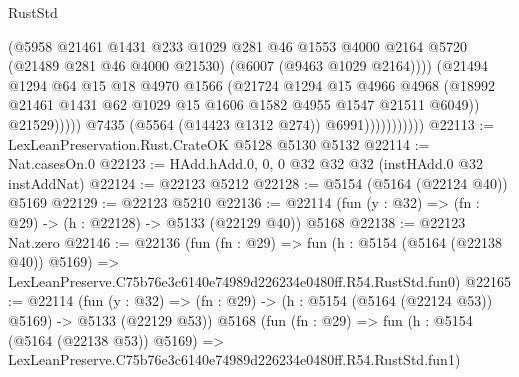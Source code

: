 \begin{lexlean}{RustStd}
\begin{coremodule}
                                    (@5958
                                      @21461
                                      @1431
                                      @233
                                      @1029
                                      @281
                                      @46
                                      @1553
                                      @4000
                                      @2164
                                      @5720
                                      (@21489 @281 @46 @4000 @21530)
                                      (@6007 (@9463 @1029 @2164))))
                                  (@21494
                                    @1294
                                    @64
                                    @15
                                    @18
                                    @4970
                                    @1566
                                    (@21724
                                      @1294
                                      @15
                                      @4966
                                      @4968
                                      (@18992
                                        @21461
                                        @1431
                                        @62
                                        @1029
                                        @15
                                        @1606
                                        @1582
                                        @4955
                                        @1547
                                        @21511
                                        @6049))
                                    @21529)))))
                          @7435
                          (@5564 (@14423 @1312 @274))
                          @6991)))))))))))
@22113 := LexLeanPreservation.Rust.CrateOK @5128 @5130 @5132
@22114 := Nat.casesOn.{0}
@22123 := HAdd.hAdd.{0, 0, 0} @32 @32 @32 (instHAdd.{0} @32 instAddNat)
@22124 := @22123 @5212
@22128 := @5154 (@5164 (@22124 @40)) @5169
@22129 := @22123 @5210
@22136 := @22114 (fun (y : @32) => (fn : @29) -> (h : @22128) -> @5133 (@22129 @40)) @5168
@22138 := @22123 Nat.zero
@22146 := @22136
    (fun (fn : @29) =>
    fun (h : @5154 (@5164 (@22138 @40)) @5169) =>
    LexLeanPreserve.C75b76e3c6140e74989d226234e0480ff.R54.RustStd.fun0)
@22165 := @22114
    (fun (y : @32) => (fn : @29) -> (h : @5154 (@5164 (@22124 @53)) @5169) -> @5133 (@22129 @53))
    @5168
    (fun (fn : @29) =>
    fun (h : @5154 (@5164 (@22138 @53)) @5169) =>
    LexLeanPreserve.C75b76e3c6140e74989d226234e0480ff.R54.RustStd.fun1)

\end{coremodule}
\end{lexlean}
